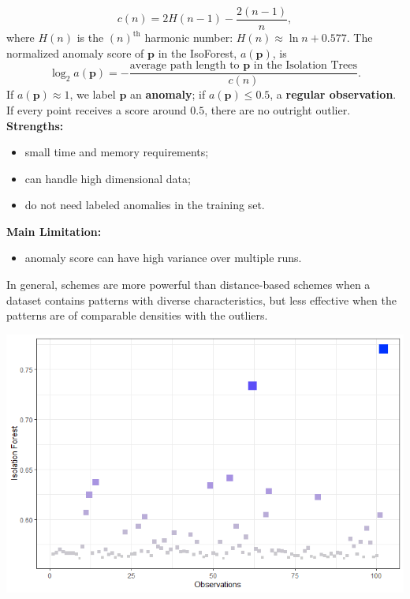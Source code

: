\documentclass[20pt,landscape,footrule,headrule]{foils}
\newcommand{\newl}{\newline\newline}
\def\fh{\foilhead}
\begin{document}
{{$$
c(n) 
= 2 H(n-1) - \frac{2(n-1)}{n},
$$
where $H(n)$ is the $(n)^{\text{th}}$ harmonic number: $ H(n)\approx \ln n + 0.577.$\newl 
The normalized anomaly score of $\mathbf{p}$ in the IsoForest, $a(\mathbf{p})$,   is 
$$
\log_2 a(\mathbf{p})
= -\frac{\text{average path length to $\mathbf{p}$ in the Isolation Trees}}{c(n)}.
$$
If $a(\mathbf{p}) \approx 1$, we label $\mathbf{p}$ an \textbf{anomaly}; if  $a(\mathbf{p}) \leq 0.5$, a \textbf{regular observation}. If every point receives a score around $0.5$, there are no outright outlier. 
\newpage\ \\ \noindent \textbf{Strengths:} 
\begin{itemize}
\item small time and memory requirements;\item  can handle high dimensional data; \item do not need labeled anomalies in the training set.
\end{itemize} \textbf{Main Limitation:}
\begin{itemize}
\item anomaly score can have high variance over multiple runs.
\end{itemize}
In general,  schemes are more powerful than distance-based schemes when a dataset contains patterns with diverse characteristics, but less effective when the patterns are of comparable densities with the outliers.

\newpage
\begin{center}
\includegraphics[width=\textwidth]{Images/IsoForest}
\end{center}


\fh{\textcolor{darkestgreen}{
5.3 -- Qualitative Methods}} \label{5.3} 

}}
\end{document}
